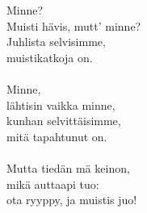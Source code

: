 
Minne? \\ Muisti hävis, mutt' minne? \\ Juhlista selvisimme, \\ muistikatkoja on. \\ \hspace{10mm} \\ Minne, \\ lähtisin vaikka minne, \\ kunhan selvittäisimme, \\ mitä tapahtunut on. \\ \hspace{10mm} \\ Mutta tiedän mä keinon, \\ mikä auttaapi tuo: \\ ota ryyppy, ja muistis juo!